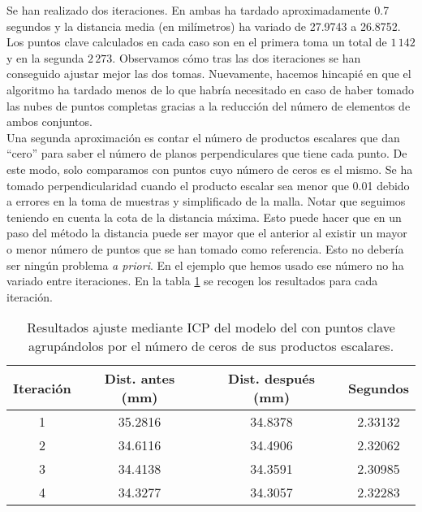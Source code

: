 Se han realizado dos iteraciones. En ambas ha tardado aproximadamente 0.7 segundos y la distancia media (en milímetros) ha variado de 27.9743 a 26.8752. Los puntos clave calculados en cada caso son en el primera toma un total de $ 1\,142 $ y en la segunda $ 2\,273 $. Observamos cómo tras las dos iteraciones se han conseguido ajustar mejor las dos tomas. Nuevamente, hacemos hincapié en que el algoritmo ha tardado menos de lo que habría necesitado en caso de haber tomado las nubes de puntos completas gracias a la reducción del número de elementos de ambos conjuntos. \\

Una segunda aproximación es contar el número de productos escalares que dan ``cero'' para saber el número de planos perpendiculares que tiene cada punto. De este modo, solo comparamos con puntos cuyo número de ceros es el mismo. Se ha tomado perpendicularidad cuando el producto escalar sea menor que 0.01 debido a errores en la toma de muestras y simplificado de la malla. Notar que seguimos teniendo en cuenta la cota de la distancia máxima. Esto puede hacer que en un paso del método la distancia puede ser mayor que el anterior al existir un mayor o menor número de puntos que se han tomado como referencia. Esto no debería ser ningún problema \textit{a priori}. En el ejemplo que hemos usado ese número no ha variado entre iteraciones. En la tabla \ref{talbe:ICPceros} se recogen los resultados para cada iteración.\\

\begin{table}[h!]
	\centering
	\begin{tabular}{| c | c | c | c |} 
		\hline
		Iteración & Dist. antes (mm)  & Dist. después (mm) & Segundos \\
		\hline
		1 &  35.2816 &  34.8378 & 2.33132\\			 
		2 & 34.6116 &  34.4906 &   2.32062\\	
		3 &  34.4138 & 34.3591  & 2.30985\\
		4 & 34.3277 &  34.3057 & 2.32283\\
		\hline
	\end{tabular}
	\caption{Resultados ajuste mediante ICP del modelo del con puntos clave agrupándolos por el número de ceros de sus productos escalares.}
	\label{talbe:ICPceros}
\end{table}

